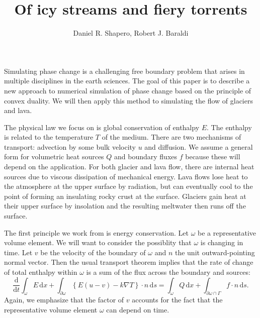 \documentclass{article}
\title{Of icy streams and fiery torrents}
\author{Daniel R. Shapero, Robert J. Baraldi}
\date{}
\theoremstyle{definition}
\theoremstyle{plain}
\newcommand{\ud}{\hspace{2pt}\mathrm{d}}
\begin{document}
\maketitle

Simulating phase change is a challenging free boundary problem that arises in multiple disciplines in the earth sciences.
The goal of this paper is to describe a new approach to numerical simulation of phase change based on the principle of convex duality.
We will then apply this method to simulating the flow of glaciers and lava.

The physical law we focus on is global conservation of enthalpy $E$.
The enthalpy is related to the temperature $T$ of the medium.
There are two mechanisms of transport: advection by some bulk velocity $u$ and diffusion.
We assume a general form for volumetric heat sources $Q$ and boundary fluxes $f$ because these will depend on the application.
For both glacier and lava flow, there are internal heat sources due to viscous dissipation of mechanical energy.
Lava flows lose heat to the atmosphere at the upper surface by radiation, but can eventually cool to the point of forming an insulating rocky crust at the surface.
Glaciers gain heat at their upper surface by insolation and the resulting meltwater then runs off the surface.

The first principle we work from is energy conservation.
Let $\omega$ be a representative volume element.
We will want to consider the possiblity that $\omega$ is changing in time.
Let $v$ be the velocity of the boundary of $\omega$ and $n$ the unit outward-pointing normal vector.
Then the usual transport theorem implies that the rate of change of total enthalpy within $\omega$ is a sum of the flux across the boundary and sources:
\begin{equation}
    \frac{\mathrm d}{\mathrm dt}\int_\omega E\ud x + \int_{\partial\omega}\left\{E(u - v) - k\nabla T\right\}\cdot n\ud s = \int_\omega Q\ud x + \int_{\partial\omega\cap\Gamma}f\cdot n\ud s.
\end{equation}
Again, we emphasize that the factor of $v$ accounts for the fact that the representative volume element $\omega$ can depend on time.
\end{document}
